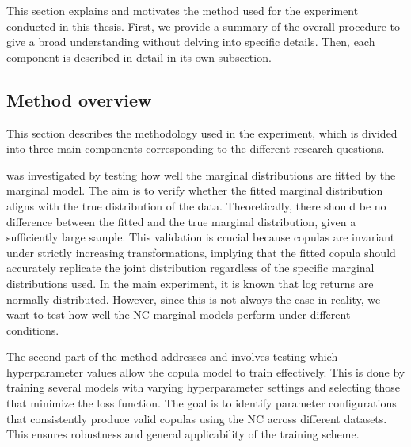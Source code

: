 This section explains and motivates the method used for the experiment conducted in this thesis. First, we provide a summary of the overall procedure to give a broad understanding without delving into specific details. Then, each component is described in detail in its own subsection.


\subsection{Method overview}
This section describes the methodology used in the experiment, which is divided into three main components corresponding to the different research questions.

\RQone was investigated by testing how well the marginal distributions are fitted by the marginal model. The aim is to verify whether the fitted marginal distribution aligns with the true distribution of the data. Theoretically, there should be no difference between the fitted and the true marginal distribution, given a sufficiently large sample. This validation is crucial because copulas are invariant under strictly increasing transformations, implying that the fitted copula should accurately replicate the joint distribution regardless of the specific marginal distributions used. In the main experiment, it is known that log returns are normally distributed. However, since this is not always the case in reality, we want to test how well the \gls{NC} marginal models perform under different conditions.

The second part of the method addresses \RQtwo and involves testing which hyperparameter values allow the copula model to train effectively. This is done by training several models with varying hyperparameter settings and selecting those that minimize the loss function. The goal is to identify parameter configurations that consistently produce valid copulas using the \gls{NC} across different datasets. This ensures robustness and general applicability of the training scheme.

